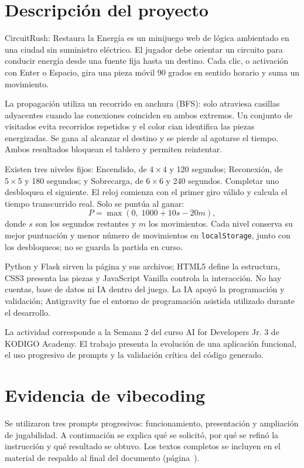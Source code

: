 \documentclass[12pt,letterpaper]{article}
\begin{document}
\portadareporte
{}

\section{Descripción del proyecto}
CircuitRush: Restaura la Energía es un minijuego web de lógica ambientado en una ciudad sin suministro eléctrico. El jugador debe orientar un circuito para conducir energía desde una fuente fija hasta un destino. Cada clic, o activación con Enter o Espacio, gira una pieza móvil 90 grados en sentido horario y suma un movimiento.

La propagación utiliza un recorrido en anchura (BFS): solo atraviesa casillas adyacentes cuando las conexiones coinciden en ambos extremos. Un conjunto de visitados evita recorridos repetidos y el color cian identifica las piezas energizadas. Se gana al alcanzar el destino y se pierde al agotarse el tiempo. Ambos resultados bloquean el tablero y permiten reintentar.

Existen tres niveles fijos: Encendido, de $4\times4$ y 120 segundos; Reconexión, de $5\times5$ y 180 segundos; y Sobrecarga, de $6\times6$ y 240 segundos. Completar uno desbloquea el siguiente. El reloj comienza con el primer giro válido y calcula el tiempo transcurrido real. Solo se puntúa al ganar:
\[
P=\max(0,\;1000+10s-20m),
\]
donde $s$ son los segundos restantes y $m$ los movimientos. Cada nivel conserva su mejor puntuación y menor número de movimientos en \texttt{localStorage}, junto con los desbloqueos; no se guarda la partida en curso.

Python y Flask sirven la página y sus archivos; HTML5 define la estructura, CSS3 presenta las piezas y JavaScript Vanilla controla la interacción. No hay cuentas, base de datos ni IA dentro del juego. La IA apoyó la programación y validación; Antigravity fue el entorno de programación asistida utilizado durante el desarrollo.

La actividad corresponde a la Semana 2 del curso AI for Developers Jr. 3 de KODIGO Academy. El trabajo presenta la evolución de una aplicación funcional, el uso progresivo de prompts y la validación crítica del código generado.

\clearpage
\section{Evidencia de vibecoding}
Se utilizaron tres prompts progresivos: funcionamiento, presentación y ampliación de jugabilidad. A continuación se explica qué se solicitó, por qué se refinó la instrucción y qué resultado se obtuvo. Los textos completos se incluyen en el material de respaldo al final del documento (página~\pageref{anexo:prompts}).
\end{document}
